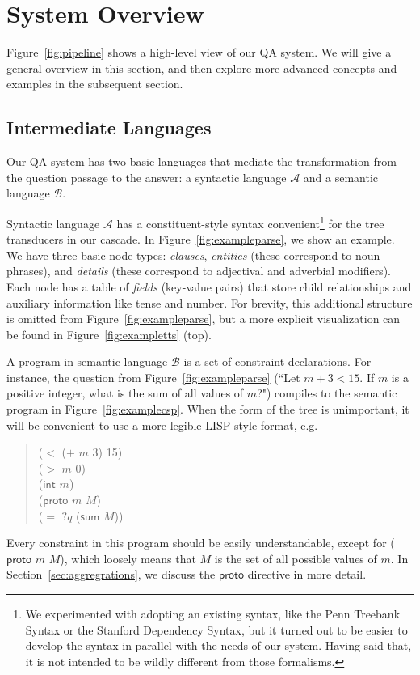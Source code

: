\documentclass[11pt,letterpaper]{article}
\begin{document}
\section{System Overview\label{sec:pipeline}}

\noindent Figure~\ref{fig:pipeline} shows a high-level view of our QA system. We will give a general overview in this section, and then explore more advanced concepts and examples in the subsequent section.



\subsection{Intermediate Languages}

Our QA system has two basic languages that mediate the transformation from the question passage to the answer: a syntactic language $\mathcal{A}$ and a semantic language $\mathcal{B}$. 



Syntactic language $\mathcal{A}$ has a constituent-style syntax convenient\footnote{We experimented with adopting an existing syntax, like the Penn Treebank Syntax or the Stanford Dependency Syntax, but it turned out to be easier to develop the syntax in parallel with the needs of our system. Having said that, it is not intended to be wildly different from those formalisms.} for the tree transducers in our cascade. In Figure~\ref{fig:exampleparse}, we show an example. We have three basic node types: \emph{clauses}, \emph{entities} (these correspond to noun phrases), and \emph{details} (these correspond to adjectival and adverbial modifiers). Each node has a table of \emph{fields} (key-value pairs) that store child relationships and auxiliary information like tense and number. For brevity, this additional structure is omitted from Figure~\ref{fig:exampleparse}, but a more explicit visualization can be found in Figure~\ref{fig:exampletts} (top).


A program in semantic language $\mathcal{B}$ is a set of constraint declarations. For instance, the question from Figure~\ref{fig:exampleparse} (``Let $m+3<15$. If $m$ is a positive integer, what is the sum of all values of $m$?") compiles to the semantic program in Figure~\ref{fig:examplecsp}. When the form of the tree is unimportant, it will be convenient to use a more legible LISP-style format, e.g.
\begin{quote}
($<$ ($+$ $m$ 3) 15) \\
($>$ $m$ 0) \\
($\mathsf{int}$ $m$) \\
($\mathsf{proto}$ $m$ $M$) \\
($=$ $?q$ ($\mathsf{sum}$ $M$))
\end{quote}
\noindent Every constraint in this program should be easily understandable, except for ($\mathsf{proto}$ $m$ $M$), which loosely means that $M$ is the set of all possible values of $m$. In Section~\ref{sec:aggregrations}, we discuss the $\mathsf{proto}$ directive in more detail.
\end{document}
